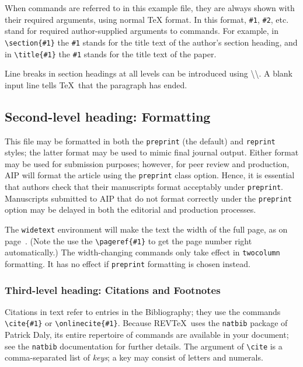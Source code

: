\documentclass[%
 aip,
 amsmath,amssymb,
preprint,%
]{revtex4-1}
\begin{document}
When commands are referred to in this example file, they are always
shown with their required arguments, using normal \TeX{} format. In
this format, \verb+#1+, \verb+#2+, etc. stand for required
author-supplied arguments to commands. For example, in
\verb+\section{#1}+ the \verb+#1+ stands for the title text of the
author's section heading, and in \verb+\title{#1}+ the \verb+#1+
stands for the title text of the paper.

Line breaks in section headings at all levels can be introduced using
\textbackslash\textbackslash. A blank input line tells \TeX\ that the
paragraph has ended. 

\subsection{\label{sec:level2}Second-level heading: Formatting}

This file may be formatted in both the \texttt{preprint} (the default) and
\texttt{reprint} styles; the latter format may be used to 
mimic final journal output. Either format may be used for submission
purposes; however, for peer review and production, AIP will format the
article using the \texttt{preprint} class option. Hence, it is
essential that authors check that their manuscripts format acceptably
under \texttt{preprint}. Manuscripts submitted to AIP that do not
format correctly under the \texttt{preprint} option may be delayed in
both the editorial and production processes.

The \texttt{widetext} environment will make the text the width of the
full page, as on page~\pageref{eq:wideeq}. (Note the use the
\verb+\pageref{#1}+ to get the page number right automatically.) The
width-changing commands only take effect in \texttt{twocolumn}
formatting. It has no effect if \texttt{preprint} formatting is chosen
instead.

\subsubsection{\label{sec:level3}Third-level heading: Citations and Footnotes}

Citations in text refer to entries in the Bibliography;
they use the commands \verb+\cite{#1}+ or \verb+\onlinecite{#1}+. 
Because REV\TeX\ uses the \verb+natbib+ package of Patrick Daly, 
its entire repertoire of commands are available in your document;
see the \verb+natbib+ documentation for further details.
The argument of \verb+\cite+ is a comma-separated list of \emph{keys};
a key may consist of letters and numerals. 
\end{document}
